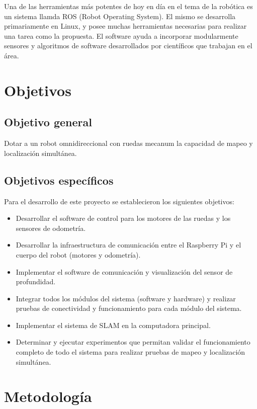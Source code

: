 Una de las herramientas más potentes de hoy en día en el tema de la robótica es un sistema llamda ROS (Robot Operating System). El mismo se desarrolla primariamente en Linux, y posee muchas herramientas necesarias para realizar una tarea como la propuesta. El software ayuda a incorporar modularmente sensores y algoritmos de software desarrollados por científicos que trabajan en el área.


\section{Objetivos}

\subsection{Objetivo general}
Dotar a un robot omnidireccional con ruedas mecanum la capacidad de mapeo y localización simultánea.

\subsection{Objetivos específicos}
Para el desarrollo de este proyecto se establecieron los siguientes objetivos:

\begin{itemize} %
	\item Desarrollar el software de control para los motores de las ruedas y los sensores de odometría.
	\item Desarrollar la infraestructura de comunicación entre el Raspberry Pi y el cuerpo del robot (motores y odometría). \item Implementar el software de comunicación y visualización del sensor de profundidad.
	\item Integrar todos los módulos del sistema (software y hardware) y realizar pruebas de conectividad y funcionamiento para cada módulo del sistema.
	\item Implementar el sistema de SLAM en la computadora principal.
	\item Determinar y ejecutar experimentos que permitan validar el funcionamiento completo de todo el sistema para realizar pruebas de mapeo y localización simultánea.
\end{itemize}

\section{Metodología}

